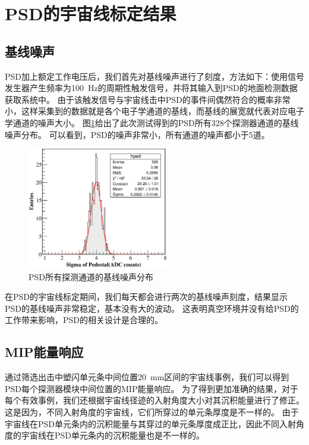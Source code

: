 \section{PSD的宇宙线标定结果}
\label{sec:cosmic_ray:results}
\subsection{基线噪声}
\label{sec:cosmic_ray:pedestal}
PSD加上额定工作电压后，我们首先对基线噪声进行了刻度，方法如下：使用信号发生器产生频率为\SI{100}{Hz}的周期性触发信号，并将其输入到PSD的地面检测数据获取系统中。
由于该触发信号与宇宙线击中PSD的事件间偶然符合的概率非常小，这样采集到的数据就是各个电子学通道的基线，而基线的展宽就代表对应电子学通道的噪声大小。
图\ref{fig:cosmic_ray:sigam_dist}给出了此次测试得到的PSD所有328个探测器通道的基线噪声分布。
可以看到，PSD的噪声非常小，所有通道的噪声都小于5道。
\begin{figure}[htbp]
	\centering
	\includegraphics[width=0.55\textwidth]{chap/cosmic_ray/fig/sigam_dist.eps}
	\caption{PSD所有探测通道的基线噪声分布}
	\label{fig:cosmic_ray:sigam_dist}
\end{figure}

在PSD的宇宙线标定期间，我们每天都会进行两次的基线噪声刻度，结果显示PSD的基线噪声非常稳定，基本没有大的波动。
这表明真空环境并没有给PSD的工作带来影响，PSD的相关设计是合理的。

\subsection{MIP能量响应}
\label{sec:cosmic_ray:mip}
通过筛选出击中塑闪单元条中间位置\SI{20}{mm}区间的宇宙线事例，我们可以得到PSD每个探测器模块中间位置的MIP能量响应。
为了得到更加准确的结果，对于每个有效事例，我们还根据宇宙线径迹的入射角度大小对其沉积能量进行了修正。
这是因为，不同入射角度的宇宙线，它们所穿过的单元条厚度是不一样的。
由于宇宙线在PSD单元条内的沉积能量与其穿过的单元条厚度成正比，因此不同入射角度的宇宙线在PSD单元条内的沉积能量也是不一样的。

